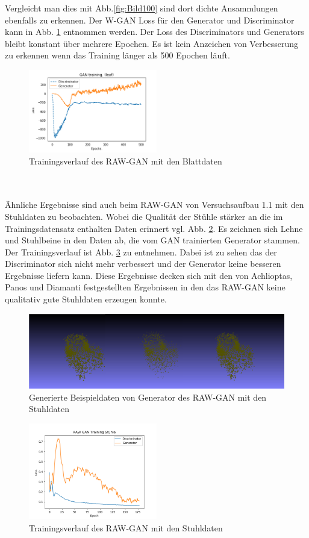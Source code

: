 \documentclass{llncs}
\begin{document}
Vergleicht man dies mit Abb.\ref{fig:Bild100} sind dort dichte Ansammlungen ebenfalls zu erkennen. Der W-GAN Loss für den Generator und Discriminator kann in Abb. \ref{fig:Bild1002} entnommen werden. Der Loss des Discriminators und Generators bleibt konstant über mehrere Epochen. Es ist kein Anzeichen von Verbesserung zu erkennen wenn das Training länger als 500 Epochen läuft. 
\begin{figure}[htbp]
	\centering
	\includegraphics[width=0.5\textwidth]{raw_gan_leaf_result.png}
	\caption{Trainingsverlauf des RAW-GAN mit den Blattdaten}
	\label{fig:Bild1002}
\end{figure}
~\\\\
Ähnliche Ergebnisse sind auch beim RAW-GAN von Versuchsaufbau 1.1 mit den Stuhldaten zu beobachten. Wobei die Qualität der Stühle stärker an die im Trainingsdatensatz enthalten Daten erinnert vgl. Abb. \ref{fig:Bild58}. Es zeichnen sich Lehne und Stuhlbeine in den Daten ab, die vom GAN trainierten Generator stammen. Der Trainingsverlauf ist Abb. \ref{fig:Bild57} zu entnehmen. Dabei ist zu sehen das der Discriminator sich nicht mehr verbessert und der Generator keine besseren Ergebnisse liefern kann. Diese Ergebnisse decken sich mit den von Achlioptas, Panos und Diamanti \cite{3dgan} festgestellten Ergebnissen in den das RAW-GAN keine qualitativ gute Stuhldaten erzeugen konnte. 
\begin{figure}[htbp] 
	\centering
	\includegraphics[width=1.0\textwidth]{raw_gan_chair_example.png}
	\caption{Generierte Beispieldaten von Generator des RAW-GAN mit den Stuhldaten}
	\label{fig:Bild58}
	\end{figure}
\begin{figure}[htbp] 
	\centering
	\includegraphics[width=0.5\textwidth]{raw_gan_chair_result.png}
	\caption{Trainingsverlauf des RAW-GAN mit den Stuhldaten}
	\label{fig:Bild57}
\end{figure}
\end{document}
